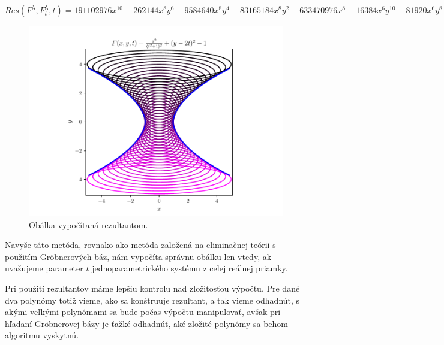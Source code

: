$ Res(F^\lambda , F_t^\lambda , t) = 191102976x^{10} + 262144x^8y^6 - 9584640x^8y^4 + 83165184x^8y^2 - 633470976x^8 - 16384x^6y^{10} - 81920x^6y^8 - 14483456x^6y^6 - 113311744x^6y^4 + 96419840x^6y^2 + 698368000x^6 - 16384x^4y^{12} - 294912x^4y^{10} - 2998272x^4y^8 - 18284544x^4y^6 - 74956800x^4y^4 - 184320000x^4y^2 - 256000000x^4. $

\begin{figure}[h]
	\centering
	\includegraphics[trim={0 0.35cm 0 0.85cm},clip]{images/resultant.pdf}
	\caption{Obálka vypočítaná rezultantom.}
	\label{fig:resultant}
\end{figure}

Navyše táto metóda, rovnako ako metóda založená na eliminačnej teórii s použitím Gröbnerových báz, nám vypočíta správnu obálku len vtedy, ak uvažujeme parameter $t$ jednoparametrického systému z celej reálnej priamky. 


Pri použití rezultantov máme lepšiu kontrolu nad zložitosťou výpočtu. Pre dané dva polynómy totiž vieme, ako sa konštruuje rezultant, a tak vieme odhadnúť, s akými veľkými polynómami sa bude počas výpočtu manipulovať, avšak pri hľadaní Gröbnerovej bázy je ťažké odhadnúť, aké zložité polynómy sa behom algoritmu vyskytnú.

